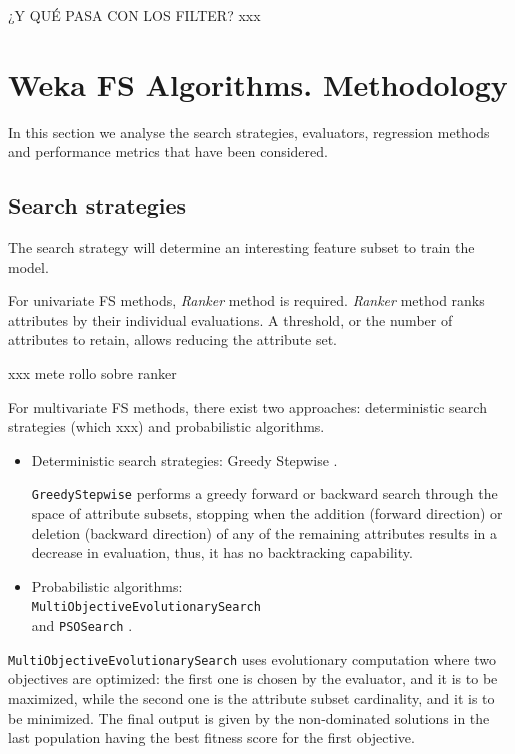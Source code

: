\documentclass[journal,twoside,web]{ieeecolor}
\newcommand{\code}[1]{\colorbox{light-gray}{\texttt{#1}}}
\begin{document}
¿Y QUÉ PASA CON LOS FILTER? xxx


\section{Weka FS Algorithms. Methodology}

In this section we analyse the search strategies, evaluators, regression methods and performance metrics that have been considered.

\subsection{Search strategies}

The search strategy will determine an interesting feature subset to train the model.

For univariate FS methods, \textit{Ranker} method \cite{yujor} is required. \textit{Ranker} method ranks attributes by their individual evaluations. A threshold, or the number of attributes to retain, allows reducing the attribute set.

xxx mete rollo sobre ranker

For multivariate FS methods, there exist two approaches: deterministic search  strategies (which xxx) and probabilistic algorithms.

\begin{itemize}

\item Deterministic search strategies: Greedy Stepwise \cite{russell2003modern}.

\code{GreedyStepwise} performs a greedy forward or backward search through the space of attribute subsets, stopping when the addition (forward direction) or deletion (backward direction) of any of the remaining attributes results in a decrease in evaluation, thus, it has no backtracking capability.

\item Probabilistic algorithms: \\ \code{MultiObjectiveEvolutionarySearch} \cite{jimenez2016multi} \\ and \code{PSO\-Search} \cite{moraglio2008geometric}.

\end{itemize}

\code{MultiObjectiveEvolutionarySearch}  uses evolutionary computation where two objectives are optimized: the first one is chosen by the evaluator, and it is to be maximized, while the second one is the attribute subset cardinality, and it is to be minimized. The final output is given by the non-dominated solutions in the last population having the best fitness score for the first objective.
\end{document}
